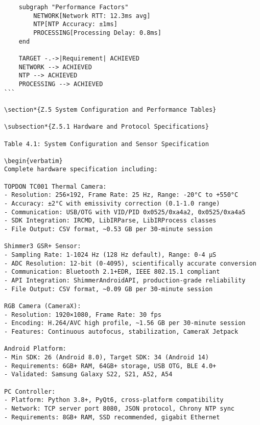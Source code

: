 \begin{verbatim}
    subgraph "Performance Factors"
        NETWORK[Network RTT: 12.3ms avg]
        NTP[NTP Accuracy: ±1ms]
        PROCESSING[Processing Delay: 0.8ms]
    end

    TARGET -.->|Requirement| ACHIEVED
    NETWORK --> ACHIEVED
    NTP --> ACHIEVED
    PROCESSING --> ACHIEVED
```

\section*{Z.5 System Configuration and Performance Tables}

\subsection*{Z.5.1 Hardware and Protocol Specifications}

Table 4.1: System Configuration and Sensor Specification

\begin{verbatim}
Complete hardware specification including:

TOPDON TC001 Thermal Camera:
- Resolution: 256×192, Frame Rate: 25 Hz, Range: -20°C to +550°C
- Accuracy: ±2°C with emissivity correction (0.1-1.0 range)
- Communication: USB/OTG with VID/PID 0x0525/0xa4a2, 0x0525/0xa4a5  
- SDK Integration: IRCMD, LibIRParse, LibIRProcess classes
- File Output: CSV format, ~0.53 GB per 30-minute session

Shimmer3 GSR+ Sensor:
- Sampling Rate: 1-1024 Hz (128 Hz default), Range: 0-4 μS
- ADC Resolution: 12-bit (0-4095), scientifically accurate conversion
- Communication: Bluetooth 2.1+EDR, IEEE 802.15.1 compliant
- API Integration: ShimmerAndroidAPI, production-grade reliability
- File Output: CSV format, ~0.09 GB per 30-minute session

RGB Camera (CameraX):  
- Resolution: 1920×1080, Frame Rate: 30 fps
- Encoding: H.264/AVC high profile, ~1.56 GB per 30-minute session
- Features: Continuous autofocus, stabilization, CameraX Jetpack

Android Platform:
- Min SDK: 26 (Android 8.0), Target SDK: 34 (Android 14)  
- Requirements: 6GB+ RAM, 64GB+ storage, USB OTG, BLE 4.0+
- Validated: Samsung Galaxy S22, S21, A52, A54

PC Controller:
- Platform: Python 3.8+, PyQt6, cross-platform compatibility
- Network: TCP server port 8080, JSON protocol, Chrony NTP sync
- Requirements: 8GB+ RAM, SSD recommended, gigabit Ethernet
\end{verbatim}

